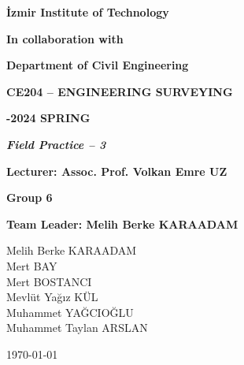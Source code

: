 \documentclass[12pt]{report}
\author{Muhammet Yağcıoğlu - 290204042}
\begin{document}
\onecolumn
\thispagestyle{empty}
\begin{center}


\textbf{\fontsize{14}{\baselineskip}\selectfont İzmir Institute of Technology}


\textbf{\fontsize{14}{\baselineskip}\selectfont In collaboration with}


\textbf{\fontsize{14}{\baselineskip}\selectfont Department of Civil Engineering}

\bigskip



\bigskip

\textbf{\fontsize{15}{\baselineskip}\selectfont CE204 – ENGINEERING
SURVEYING}

\bigskip

\textbf{\fontsize{16}{\baselineskip}-2024 SPRING}

\bigskip

\bigskip



\textit{\textbf{\fontsize{14}{\baselineskip}\selectfont Field Practice – 3}}

\bigskip



\bigskip

\textbf{\fontsize{14}{\baselineskip}\selectfont Lecturer: Assoc. Prof. Volkan Emre UZ }

\bigskip

\textbf{\fontsize{14}{\baselineskip}\selectfont Group 6}

\bigskip

\textbf{\fontsize{14}{\baselineskip}\selectfont Team Leader: Melih Berke	KARAADAM}

\bigskip

Melih Berke	KARAADAM\\
Mert BAY\\
Mert BOSTANCI \\
Mevlüt Yağız KÜL\\
Muhammet YAĞCIOĞLU\\
Muhammet Taylan ARSLAN\\


\bigskip

\bigskip

\bigskip

{\today}
\end{center}

\clearpage
\end{document}
